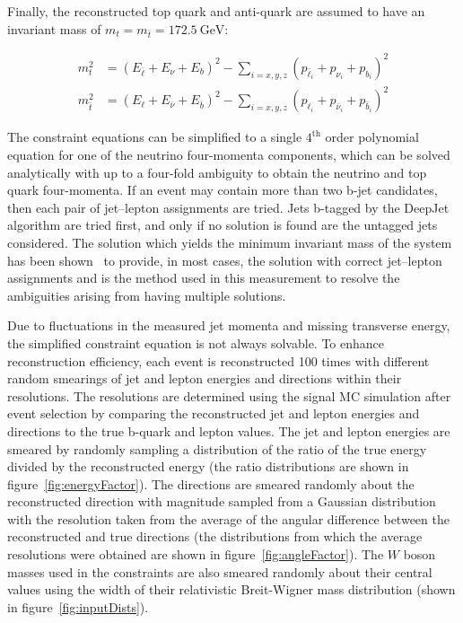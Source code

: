 Finally, the reconstructed top quark and anti-quark are assumed to have an invariant mass of $m_{t} = m_{\bar{t}} = \SI{172.5}{\GeV}$:
\begin{linenomath*}
\begin{align}
m_t^2 &= \left(E_{\bar{\ell}}+E_\nu+E_b\right)^2- \sum_{i = x, y, z} \left(p_{\bar{\ell}_i}+p_{\nu_i}+p_{b_i}\right)^2 \\
m_{\bar{t}}^2 &= \left(E_{\ell}+E_{\bar{\nu}}+E_{\bar{b}}\right)^2 - \sum_{i = x, y, z} \left(p_{\ell_i}+p_{\bar{\nu}_i}+p_{\bar{b}_i}\right)^2 
\end{align}
\end{linenomath*}
The constraint equations can be simplified to a single $4^{\text{th}}$ order polynomial equation for one of the neutrino four-momenta components, which can be solved analytically with up to a four-fold ambiguity to obtain the neutrino and top quark four-momenta.
If an event may contain more than two b-jet candidates, then each pair of jet--lepton assignments are tried.
Jets b-tagged by the DeepJet algorithm are tried first, and only if no solution is found are the untagged jets considered.
The solution which yields the minimum invariant mass of the \ttbar system has been shown~\cite{PhysRevD.73.112006} to provide, in most cases, the solution with correct jet--lepton assignments and is the method used in this measurement to resolve the ambiguities arising from having multiple solutions.

Due to fluctuations in the measured jet momenta and missing transverse energy, the simplified constraint equation is not always solvable.
To enhance reconstruction efficiency, each event is reconstructed 100 times with different random smearings of jet and lepton energies and directions within their resolutions.
The resolutions are determined using the signal MC simulation after event selection by comparing the reconstructed jet and lepton energies and directions to the true b-quark and lepton values.
The jet and lepton energies are smeared by randomly sampling a distribution of the ratio of the true energy divided by the reconstructed energy (the ratio distributions are shown in figure~\ref{fig:energyFactor}).
The directions are smeared randomly about the reconstructed direction with magnitude sampled from a Gaussian distribution with the resolution taken from the average of the angular difference between the reconstructed and true directions (the distributions from which the average resolutions were obtained are shown in figure~\ref{fig:angleFactor}).
The $W$ boson masses used in the constraints are also smeared randomly about their central values using the width of their relativistic Breit-Wigner mass distribution (shown in figure~\ref{fig:inputDists}).

